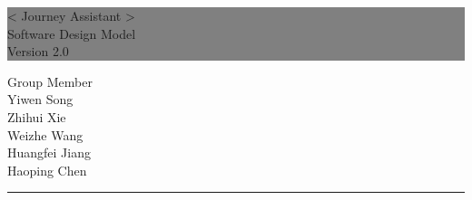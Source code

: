 \documentclass[10pt]{article}
\begin{document}

\begin{titlepage} %
	
	
	\colorbox{grey}{
		\parbox[t]{1.1\textwidth}{ %
			\parbox[t]{1.02\textwidth}{ %
				\raggedleft %
				\fontsize{34pt}{40pt}\selectfont %
				\vspace{0.7cm} %
				
				< Journey Assistant >\\
                Software Design Model\\
                Version 2.0\\
				
				\vspace{0.7cm} %
			}
		}
	}
	
	\vfill %
	
	
	\parbox[t]{1\textwidth}{ %
		\raggedleft %
		\large %
		{\Large Group Member}\\[4pt] %
        Yiwen Song\\
        Zhihui Xie\\
        Weizhe Wang\\
        Huangfei Jiang\\
        Haoping Chen\\
		
		\hfill\rule{0.2\linewidth}{1pt}%
    }
    
	
\end{titlepage}
\end{document}
